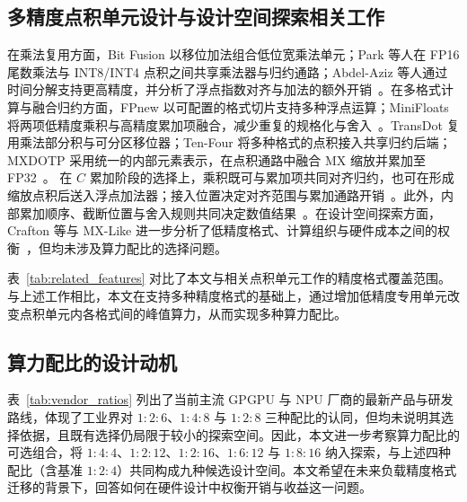 \subsection{多精度点积单元设计与设计空间探索相关工作}
\label{sec:datapath_sharing}

在乘法复用方面，Bit Fusion 以移位加法组合低位宽乘法单元；Park 等人在 FP16 尾数乘法与 INT8/INT4 点积之间共享乘法器与归约通路；Abdel-Aziz 等人通过时间分解支持更高精度，并分析了浮点指数对齐与加法的额外开销~\cite{bitfusion2018,parkMultimode8KMACHWutilizationaware2022,abdelaziz2021overheads}。在多格式计算与融合归约方面，FPnew 以可配置的格式切片支持多种浮点运算；MiniFloats 将两项低精度乘积与高精度累加项融合，减少重复的规格化与舍入~\cite{mach2020fpnew,bertaccini2022minifloat}。TransDot 复用乘法部分积与可分区移位器；Ten-Four 将多种格式的点积接入共享归约后端；MXDOTP 采用统一的内部元素表示，在点积通路中融合 MX 缩放并累加至 FP32~\cite{transdot2026,rout2026tenfourv3,islamoglu2025mxdotp}。
在 $C$ 累加阶段的选择上，乘积既可与累加项共同对齐归约，也可在形成缩放点积后送入浮点加法器；接入位置决定对齐范围与累加通路开销~\cite{bertaccini2022minifloat,lutzFusedFP84Way2024}。此外，内部累加顺序、截断位置与舍入规则共同决定数值结果~\cite{sun2023tensorcores,xie2025mmasim}。在设计空间探索方面，Crafton 等与 MX-Like 进一步分析了低精度格式、计算组织与硬件成本之间的权衡~\cite{paretomac2025,zhao2026mxlike}，但均未涉及算力配比的选择问题。

表~\ref{tab:related_features} 对比了本文与相关点积单元工作的精度格式覆盖范围。与上述工作相比，本文在支持多种精度格式的基础上，通过增加低精度专用单元改变点积单元内各格式间的峰值算力，从而实现多种算力配比。

\subsection{算力配比的设计动机}
\label{sec:commercial_ratios}
\label{sec:ratio_motivation}

表~\ref{tab:vendor_ratios} 列出了当前主流 GPGPU 与 NPU 厂商的最新产品与研发路线，体现了工业界对 $1:2:6$、$1:4:8$ 与 $1:2:8$ 三种配比的认同，但均未说明其选择依据，且既有选择仍局限于较小的探索空间。因此，本文进一步考察算力配比的可选组合，将 $1:4:4$、$1:2:12$、$1:2:16$、$1:6:12$ 与 $1:8:16$ 纳入探索，与上述四种配比（含基准 $1:2:4$）共同构成九种候选设计空间。本文希望在未来负载精度格式迁移的背景下，回答如何在硬件设计中权衡开销与收益这一问题。